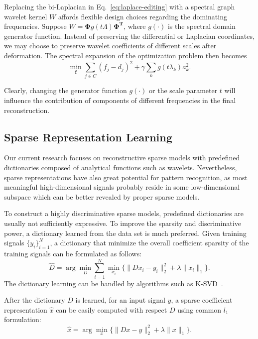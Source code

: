 Replacing the bi-Laplacian in Eq.~\ref{eq:laplace-editing} with a spectral graph wavelet kernel
$W$ affords flexible design choices regarding the dominating frequencies. Suppose
$W=\mathbf{\Phi}g(t\Lambda)\mathbf{\Phi^T}$, where $g(\cdot)$ is the spectral domain generator
function. Instead of preserving the differential or Laplacian coordinates, we may choose
to preserve wavelet coefficients of different scales after deformation. The spectral expansion
of the optimization problem then becomes
\begin{equation}
\label{eq:sgw-editing}
\min_\mathbf{f} \sum_{j\in C} (f_j - d_j)^2 + \gamma \sum_k g(t\lambda_k) a_k^2.
\end{equation}

Clearly, changing the generator function $g(\cdot)$ or the scale parameter $t$ will
influence the contribution of components of different frequencies in the final reconstruction.

\subsection*{Sparse Representation Learning}
Our current research focuses on reconstructive sparse models with predefined dictionaries
composed of analytical functions such as wavelets. Nevertheless, sparse representations have
also great potential for pattern recognition, as most meaningful high-dimensional
signals probably reside in some low-dimensional subspace which can be better revealed by proper
sparse models.

To construct a highly discriminative sparse models, predefined dictionaries are usually not
sufficiently expressive. To improve the sparsity and discriminative power, a dictionary learned from
the data set is much preferred. Given training signals $\{y_i\}_{i=1}^N$, a dictionary that
minimize the overall coefficient sparsity of the training signals can be formulated as follows:
\begin{equation}
\label{eq:dictionary-learning}
\hat{D}=\arg\min_D\sum_{i=1}^N \min_{x_i}\{\|Dx_i - y_i\|_2^2 + \lambda\|x_i\|_1\}.
\end{equation}
The dictionary learning can be handled by algorithms such as K-SVD~\cite{Aharon2006}.

After the dictionary $D$ is learned, for an input signal $y$, a sparse coefficient
representation $\hat{x}$ can be easily computed with respect $D$ using
common $l_1$ formulation:
\begin{equation}
\hat{x} = \arg\min_{x} \{\|Dx - y\|_2^2 + \lambda\|x\|_1\}.
\end{equation}

